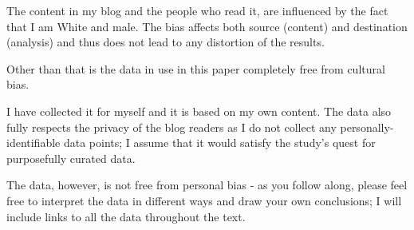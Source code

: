 The content in my blog and the people who read it, are influenced by the fact that I am White and male. The bias affects both source (content) and destination (analysis) and thus does not lead to any distortion of the results.

Other than that is the data in use in this paper completely free from cultural bias. 

I have collected it for myself and it is based on my own content. The data also fully respects the privacy of the blog readers as I do not collect any personally-identifiable data points; I assume that it would satisfy the study's quest for purposefully curated data.

The data, however, is not free from personal bias - as you follow along, please feel free to interpret the data in different ways and draw your own conclusions; I will include links to all the data throughout the text.
